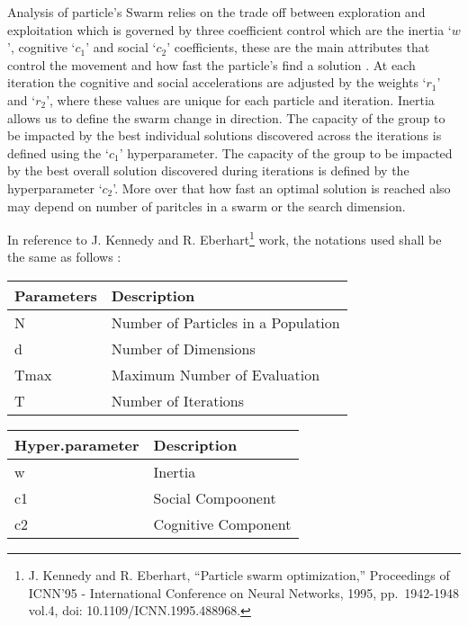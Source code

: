 \documentclass[
]{article}
\begin{document}
Analysis of particle's Swarm relies on the trade off between exploration
and exploitation which is governed by three coefficient control which
are the inertia `\(w\)', cognitive `\(c_1\)' and social `\(c_2\)'
coefficients, these are the main attributes that control the movement
and how fast the particle's find a solution . At each iteration the
cognitive and social accelerations are adjusted by the weights `\(r_1\)'
and `\(r_2\)', where these values are unique for each particle and
iteration. Inertia allows us to define the swarm change in direction.
The capacity of the group to be impacted by the best individual
solutions discovered across the iterations is defined using the
`\(c_1\)' hyperparameter. The capacity of the group to be impacted by
the best overall solution discovered during iterations is defined by the
hyperparameter `\(c_2\)'. More over that how fast an optimal solution is
reached also may depend on number of paritcles in a swarm or the search
dimension.

In reference to J. Kennedy and R. Eberhart\footnote{J. Kennedy and R.
  Eberhart, ``Particle swarm optimization,'' Proceedings of ICNN'95 -
  International Conference on Neural Networks, 1995, pp.~1942-1948
  vol.4, doi: 10.1109/ICNN.1995.488968.} work, the notations used shall
be the same as follows :

\begin{table}[H]
\centering\begingroup\fontsize{8}{10}\selectfont

\begin{tabular}{l|l}
\hline
Parameters & Description\\
\hline
N & Number of Particles in a Population\\
\hline
d & Number of Dimensions\\
\hline
Tmax & Maximum Number of Evaluation\\
\hline
T & Number of Iterations\\
\hline
\end{tabular}
\endgroup{}
\end{table}

\begin{table}[H]
\centering\begingroup\fontsize{8}{10}\selectfont

\begin{tabular}{l|l}
\hline
Hyper.parameter & Description\\
\hline
w & Inertia\\
\hline
c1 & Social Compoonent\\
\hline
c2 & Cognitive Component\\
\hline
\end{tabular}
\endgroup{}
\end{table}
\end{document}
